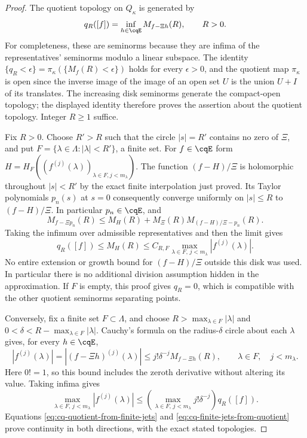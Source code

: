 \begin{proof}
The quotient topology on $Q_\kappa$ is generated by
\begin{equation}\label{eq:cq-compact-quotient-seminorm}
 q_R([f])=\inf_{h\in\cqE}M_{f-\Xi h}(R),\qquad R>0.
\end{equation}
For completeness, these are seminorms because they are infima of
the representatives' seminorms modulo a linear subspace. The
identity
$\{q_R<\epsilon\}=\pi_\kappa(\{M_f(R)<\epsilon\})$
holds for every $\epsilon>0$, and the quotient map
$\pi_\kappa$ is open since the inverse image of the image of
an open set $U$ is the union $U+I$ of its translates.
The increasing disk seminorms generate the compact-open topology;
the displayed identity therefore proves the assertion about the
quotient topology. Integer $R\geq1$ suffice.

Fix $R>0$. Choose $R'>R$ such that the circle $|s|=R'$
contains no zero of $\Xi$, and put
$F=\{\lambda\in\Lambda:|\lambda|<R'\}$, a finite set.
For $f\in\cqE$ form
$H=H_F((f^{(j)}(\lambda))_{\lambda\in F,j<m_\lambda})$.
The function $(f-H)/\Xi$ is holomorphic throughout $|s|<R'$
by the exact finite interpolation just proved. Its Taylor
polynomials $p_n(s)$ at $s=0$ consequently converge uniformly on
$|s|\leq R$ to $(f-H)/\Xi$. In particular $p_n\in\cqE$,
and
\[
 M_{f-\Xi p_n}(R)
 \leq M_H(R)+M_\Xi(R)
        M_{(f-H)/\Xi-p_n}(R).
\]
Taking the infimum over admissible representatives and then the
limit gives
\begin{equation}\label{eq:cq-quotient-from-finite-jets}
 q_R([f])\leq M_H(R)
 \leq C_{R,F}
       \max_{\lambda\in F,\,j<m_\lambda}|f^{(j)}(\lambda)|.
\end{equation}
No entire extension or growth bound for $(f-H)/\Xi$ outside this
disk was used. In particular there is no additional division
assumption hidden in the approximation. If $F$ is empty, this
proof gives $q_R=0$, which is compatible with the other quotient
seminorms separating points.

Conversely, fix a finite set $F\subset\Lambda$, and choose
$R>\max_{\lambda\in F}|\lambda|$ and
$0<\delta<R-\max_{\lambda\in F}|\lambda|$.
Cauchy's formula on the radius-$\delta$ circle about each
$\lambda$ gives, for every $h\in\cqE$,
\[
 |f^{(j)}(\lambda)|
 =|(f-\Xi h)^{(j)}(\lambda)|
 \leq j!\delta^{-j}M_{f-\Xi h}(R),
 \qquad\lambda\in F,\quad j<m_\lambda.
\]
Here $0!=1$, so this bound includes the zeroth derivative without
altering its value. Taking infima gives
\begin{equation}\label{eq:cq-finite-jets-from-quotient}
 \max_{\lambda\in F,\,j<m_\lambda}|f^{(j)}(\lambda)|
 \leq\left(\max_{\lambda\in F,\,j<m_\lambda}
                        j!\delta^{-j}\right)q_R([f]).
\end{equation}
Equations \eqref{eq:cq-quotient-from-finite-jets} and
\eqref{eq:cq-finite-jets-from-quotient} prove continuity in both
directions, with the exact stated topologies.


\end{proof}
